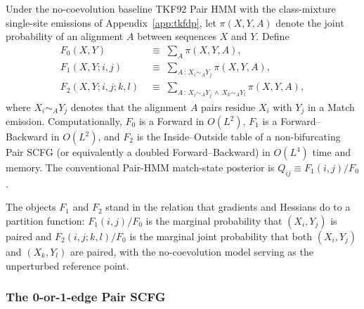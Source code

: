 Under the no-coevolution baseline TKF92 Pair HMM with the
class-mixture single-site emissions of Appendix~\ref{app:tkfdp},
let $\pi(X, Y, A)$ denote the joint probability of an alignment
$A$ between sequences $X$ and $Y$. Define
\begin{align}
F_0(X, Y) \;&\equiv\; \sum_A \pi(X, Y, A), \label{eq:F0} \\
F_1(X, Y; i, j) \;&\equiv\; \sum_{A \,:\, X_i \sim_A Y_j} \pi(X, Y, A), \label{eq:F1} \\
F_2(X, Y; i, j; k, l) \;&\equiv\; \sum_{A \,:\, X_i \sim_A Y_j \,\wedge\, X_k \sim_A Y_l} \pi(X, Y, A), \label{eq:F2}
\end{align}
where $X_i \sim_A Y_j$ denotes that the alignment $A$ pairs residue
$X_i$ with $Y_j$ in a Match emission. Computationally, $F_0$ is a
Forward in $O(L^2)$, $F_1$ is a Forward--Backward in $O(L^2)$, and
$F_2$ is the Inside--Outside table of a non-bifurcating Pair SCFG
(or equivalently a doubled Forward--Backward) in $O(L^4)$ time and
memory. The conventional Pair-HMM match-state posterior is
$Q_{ij} \equiv F_1(i, j) / F_0$.

The objects $F_1$ and $F_2$ stand in the relation that gradients
and Hessians do to a partition function: $F_1(i, j) / F_0$ is the
marginal probability that $(X_i, Y_j)$ is paired and
$F_2(i, j; k, l) / F_0$ is the marginal joint probability that
both $(X_i, Y_j)$ and $(X_k, Y_l)$ are paired, with the
no-coevolution model serving as the unperturbed reference point.

\subsubsection*{The 0-or-1-edge Pair SCFG}

